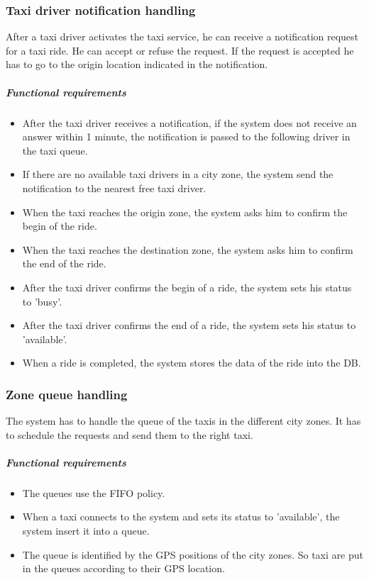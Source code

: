 \subsubsection{Taxi driver notification handling}
After a taxi driver activates the taxi service, he can receive a notification request for a taxi ride. He can accept or refuse the request. If the request is accepted he has to go to the origin location indicated in the notification.

    \subparagraph{Functional requirements}
    \noindent
        \begin{itemize}
            \item After the taxi driver receives a notification, if the system does not receive an answer within 1 minute, the notification is passed to the following driver in the taxi queue.
            \item If there are no available taxi drivers in a city zone, the system send the notification to the nearest free taxi driver.
            \item When the taxi reaches the origin zone, the system asks him to confirm the begin of the ride.
            \item When the taxi reaches the destination zone, the system asks him to confirm the end of the ride.
            \item After the taxi driver confirms the begin of a ride, the system sets his status to 'busy'.
            \item After the taxi driver confirms the end of a ride, the system sets his status to 'available'.
            \item When a ride is completed, the system stores the data of the ride into the DB.
        \end{itemize}
        
        
\subsubsection{Zone queue handling}
The system has to handle the queue of the taxis in the different city zones. It has to schedule the requests and send them to the right taxi.
    
	\subparagraph{Functional requirements}
	\noindent
	    \begin{itemize}
	        \item The queues use the FIFO policy.
	        \item When a taxi connects to the system and sets its status to 'available', the system insert it into a queue.
	        \item The queue is identified by the GPS positions of the city zones. So taxi are put in the queues according to their GPS location.
	    \end{itemize}
    
